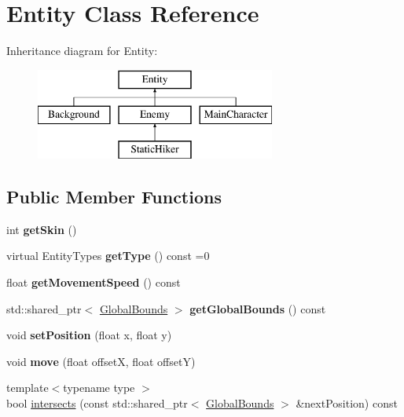 \hypertarget{class_entity}{}\section{Entity Class Reference}
\label{class_entity}
Inheritance diagram for Entity\+:\begin{figure}[H]
\begin{center}
\leavevmode
\includegraphics[height=3.000000cm]{class_entity}
\end{center}
\end{figure}
\subsection*{Public Member Functions}
\begin{DoxyCompactItemize}
\item 
\mbox{\label{class_entity_a2ab2f30624fe669fd8fb72ab7a3e0318}} 
int {\bfseries get\+Skin} ()
\item 
\mbox{\label{class_entity_a729e4d1d4a7f6f927f7fdf083c5dcc13}} 
virtual Entity\+Types {\bfseries get\+Type} () const =0
\item 
\mbox{\label{class_entity_a2234159416866c9c4657c9c481f0e632}} 
float {\bfseries get\+Movement\+Speed} () const
\item 
\mbox{\label{class_entity_a5601a5a44bb9e13a001cbecb66154701}} 
std\+::shared\+\_\+ptr$<$ \hyperlink{struct_global_bounds}{Global\+Bounds} $>$ {\bfseries get\+Global\+Bounds} () const
\item 
\mbox{\label{class_entity_a93306ecdce9446da37560f5f2b5307c0}} 
void {\bfseries set\+Position} (float x, float y)
\item 
\mbox{\label{class_entity_a474692558c0fcb4f3d0b931022b847d8}} 
void {\bfseries move} (float offsetX, float offsetY)
\item 
{\footnotesize template$<$typename type $>$ }\\bool \hyperlink{class_entity_a6dcfeadddb85cce9f5352b6553ab404b}{intersects} (const std\+::shared\+\_\+ptr$<$ \hyperlink{struct_global_bounds}{Global\+Bounds} $>$ \&next\+Position) const
\end{DoxyCompactItemize}
